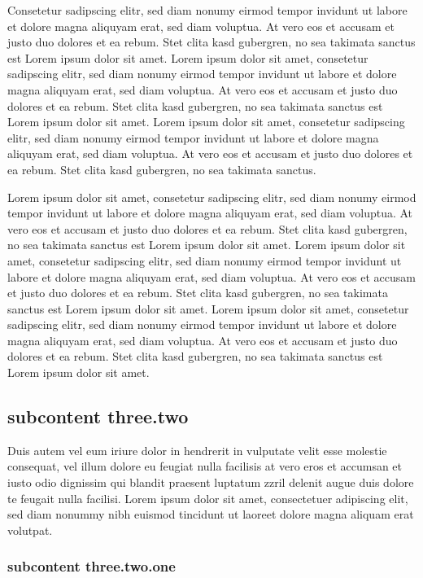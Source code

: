 Consetetur sadipscing elitr, sed diam nonumy eirmod tempor invidunt ut labore et
dolore magna aliquyam erat, sed diam voluptua. At vero eos et accusam et justo
duo dolores et ea rebum. Stet clita kasd gubergren, no sea takimata sanctus est
Lorem ipsum dolor sit amet. Lorem ipsum dolor sit amet, consetetur sadipscing
elitr, sed diam nonumy eirmod tempor invidunt ut labore et dolore magna aliquyam
erat, sed diam voluptua. At vero eos et accusam et justo duo dolores et ea
rebum. Stet clita kasd gubergren, no sea takimata sanctus est Lorem ipsum dolor
sit amet. Lorem ipsum dolor sit amet, consetetur sadipscing elitr, sed diam
nonumy eirmod tempor invidunt ut labore et dolore magna aliquyam erat, sed diam
voluptua. At vero eos et accusam et justo duo dolores et ea rebum. Stet clita
kasd gubergren, no sea takimata sanctus.

Lorem ipsum dolor sit amet, consetetur sadipscing elitr, sed diam nonumy eirmod
tempor invidunt ut labore et dolore magna aliquyam erat, sed diam voluptua. At
vero eos et accusam et justo duo dolores et ea rebum. Stet clita kasd gubergren,
no sea takimata sanctus est Lorem ipsum dolor sit amet. Lorem ipsum dolor sit
amet, consetetur sadipscing elitr, sed diam nonumy eirmod tempor invidunt ut
labore et dolore magna aliquyam erat, sed diam voluptua. At vero eos et accusam
et justo duo dolores et ea rebum. Stet clita kasd gubergren, no sea takimata
sanctus est Lorem ipsum dolor sit amet. Lorem ipsum dolor sit amet, consetetur
sadipscing elitr, sed diam nonumy eirmod tempor invidunt ut labore et dolore
magna aliquyam erat, sed diam voluptua. At vero eos et accusam et justo duo
dolores et ea rebum. Stet clita kasd gubergren, no sea takimata sanctus est
Lorem ipsum dolor sit amet.

 \subsection{subcontent three.two}   

Duis autem vel eum iriure dolor in hendrerit in vulputate velit esse molestie
consequat, vel illum dolore eu feugiat nulla facilisis at vero eros et accumsan
et iusto odio dignissim qui blandit praesent luptatum zzril delenit augue duis
dolore te feugait nulla facilisi. Lorem ipsum dolor sit amet, consectetuer
adipiscing elit, sed diam nonummy nibh euismod tincidunt ut laoreet dolore magna
aliquam erat volutpat.
 \subsubsection{subcontent three.two.one}   

